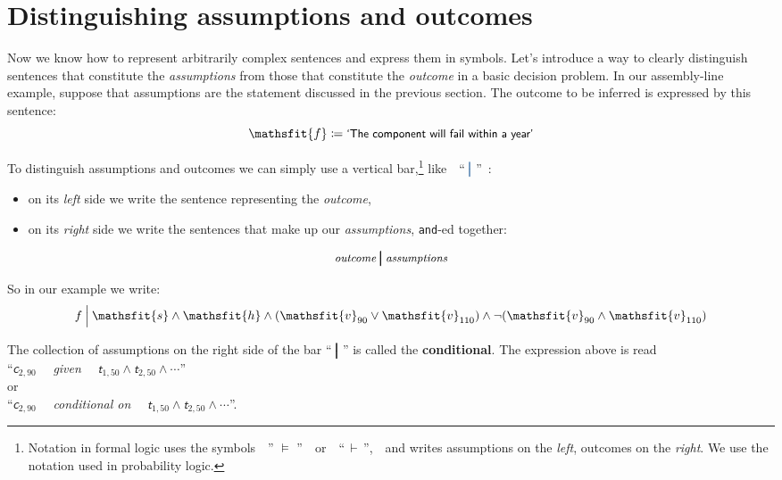 \documentclass[
  a4paper,
  DIV=11,
  numbers=noendperiod,
  oneside]{scrreprt}
\providecommand{\tightlist}{%
  \setlength{\itemsep}{0pt}\setlength{\parskip}{0pt}}\usepackage{longtable,booktabs,array}
\begin{document}
\hypertarget{distinguishing-assumptions-and-outcomes}{%
\section{Distinguishing assumptions and
outcomes}\label{distinguishing-assumptions-and-outcomes}}

Now we know how to represent arbitrarily complex sentences and express
them in symbols. Let's introduce a way to clearly distinguish sentences
that constitute the \emph{assumptions} from those that constitute the
\emph{outcome} in a basic decision problem. In our assembly-line
example, suppose that assumptions are the statement discussed in the
previous section. The outcome to be inferred is expressed by this
sentence: \[
\mathsfit{f} \coloneqq \textsf{\small`The component will fail within a year'}
\]

To distinguish assumptions and outcomes we can simply use a vertical
bar,\footnote{Notation in formal logic uses the symbols~~{'' \(\models\)
  ''}~~or~~{``\,\(\vdash\)\,'',}~~and writes assumptions on the
  \emph{left}, outcomes on the \emph{right}. We use the notation used in
  probability logic.}
like~~{``\(\color[RGB]{68,119,170}\pmb{\nonscript\:\big\vert\nonscript\:\mathopen{}}\)''~:}

\begin{itemize}
\tightlist
\item
  on its \emph{left} side we write the sentence representing the
  \emph{outcome},
\item
  on its \emph{right} side we write the sentences that make up our
  \emph{assumptions}, \texttt{and}-ed together:
\end{itemize}

\[
\textit{\small outcome} \pmb{\nonscript\:\big\vert\nonscript\:\mathopen{}} \textit{\small assumptions}
\]

So in our example we write: \[
f \nonscript\:\Big\vert\nonscript\:\mathopen{}
\mathsfit{s} \land \mathsfit{h} \land
(\mathsfit{v}_{90} \lor \mathsfit{v}_{110})
\land
\lnot(\mathsfit{v}_{90} \land \mathsfit{v}_{110})
\]

The collection of assumptions on the right side of the bar
{``\(\pmb{\nonscript\:\big\vert\nonscript\:\mathopen{}}\)''} is called
the {\textbf{conditional}}. The expression above is read\\
{``\(\mathsfit{c}_{2,90}\)~~ \emph{given}~~
\(\mathsfit{t}_{1,50} \land \mathsfit{t}_{2,50} \land\dotsb\)''}\\
or\\
{``\(\mathsfit{c}_{2,90}\)~~ \emph{conditional on}~~
\(\mathsfit{t}_{1,50} \land \mathsfit{t}_{2,50} \land\dotsb\)''.}
\end{document}
